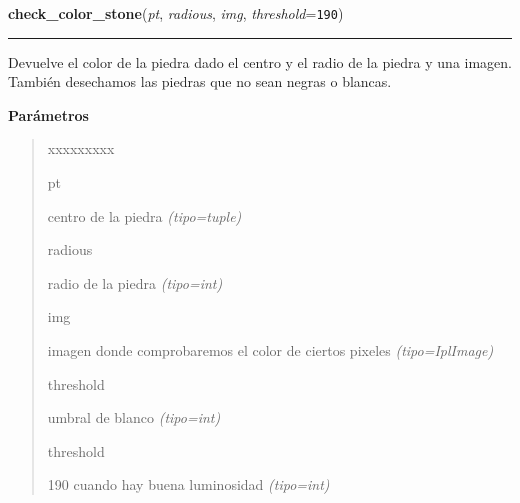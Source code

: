 \hspace{.8\funcindent}\begin{boxedminipage}{\funcwidth}

    \raggedright \textbf{check\_color\_stone}(\textit{pt}, \textit{radious}, \textit{img}, \textit{threshold}={\tt 190})

    \vspace{-1.5ex}

    \rule{\textwidth}{0.5\fboxrule}
\setlength{\parskip}{2ex}
Devuelve el color de la piedra dado el centro y el radio de la piedra y una imagen. También desechamos las piedras que no sean negras o blancas.

\setlength{\parskip}{1ex}
      \textbf{Parámetros}
      \vspace{-1ex}

      \begin{quote}
        \begin{Ventry}{xxxxxxxxx}

          \item[pt]


centro de la piedra
            {\it (tipo=tuple)}

          \item[radious]


radio de la piedra
            {\it (tipo=int)}

          \item[img]


imagen donde comprobaremos el color de ciertos pixeles
            {\it (tipo=IplImage)}

          \item[threshold]


umbral de blanco
            {\it (tipo=int)}

          \item[threshold]


190 cuando hay buena luminosidad
            {\it (tipo=int)}

        \end{Ventry}

      \end{quote}

    \end{boxedminipage}




